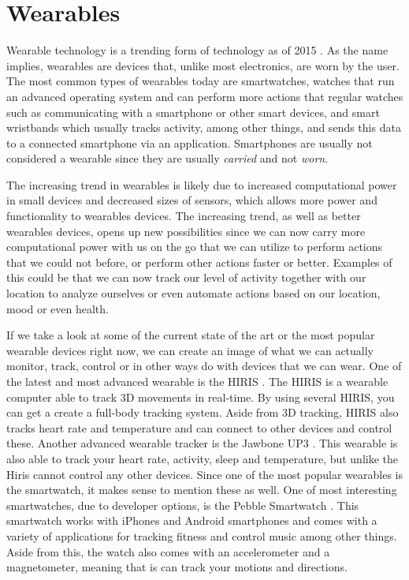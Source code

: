 \section{Wearables}\label{sec:wearables} %
Wearable technology is a trending form of technology as of 2015 \cite{WEARABLESTREND}. 
As the name implies, wearables are devices that, unlike most electronics, are worn by the user. 
The most common types of wearables today are smartwatches, 
\ie watches that run an advanced operating system and can perform more actions that regular watches such as communicating with a smartphone or other smart devices, 
and smart wristbands which usually tracks activity, 
among other things, and sends this data to a connected smartphone via an application. 
Smartphones are usually not considered a wearable since they are usually \emph{carried} and not \emph{worn}. 

The increasing trend in wearables is likely due to increased computational power in small devices and decreased sizes of sensors, 
which allows more power and functionality to wearables devices. 
The increasing trend, as well as better wearables devices, 
opens up new possibilities since we can now carry more computational power with us on the go that we can utilize to perform actions that we could not before, 
or perform other actions faster or better. 
Examples of this could be that we can now track our level of activity together with our location to analyze ourselves or even automate actions based on our location, mood or even health. 

If we take a look at some of the current state of the art or the most popular wearable devices right now, 
we can create an image of what we can actually monitor, track, control or in other ways do with devices that we can wear. 
One of the latest and most advanced wearable is the HIRIS \cite{hirisweb}. 
The HIRIS is a wearable computer able to track 3D movements in real-time. 
By using several HIRIS, you can get a create a full-body tracking system. 
Aside from 3D tracking, HIRIS also tracks heart rate and temperature and can connect to other devices and control these. 
Another advanced wearable tracker is the Jawbone UP3 \cite{JAWBONE}. 
This wearable is also able to track your heart rate, activity, sleep and temperature, but unlike the Hiris cannot control any other devices. 
Since one of the most popular wearables is the smartwatch, it makes sense to mention these as well. 
One of most interesting smartwatches, due to developer options, is the Pebble Smartwatch \cite{PEBBLE}. 
This smartwatch works with iPhones and Android smartphones and comes with a variety of applications for tracking fitness and control music among other things. 
Aside from this, the watch also comes with an accelerometer and a magnetometer, meaning that is can track your motions and directions. 

